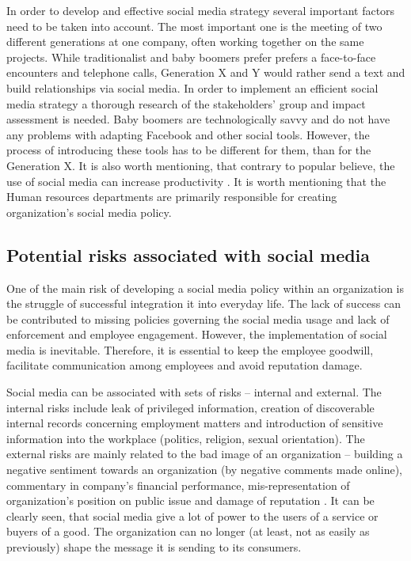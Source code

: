 \documentclass[a4paper,fleqn,11pt,dvips,titlepage]{article}
\numberwithin{figure}{section}
\numberwithin{equation}{section}
\begin{document}
In order to develop and effective social media strategy several important factors need to be taken into account.
The most important one is the meeting of two different generations at one company, often working together on the same projects.
While traditionalist and baby boomers prefer prefers a face-to-face encounters and telephone calls,
Generation X and Y would rather send a text and build relationships via social media.
In order to implement an efficient social media strategy a thorough research of the stakeholders’ group and impact assessment is needed.
Baby boomers are technologically savvy and do not have any problems with adapting Facebook and other social tools.
However, the process of introducing these tools has to be different for them, than for the Generation X.
It is also worth mentioning, that contrary to popular believe, the use of social media can increase productivity \cite{kpmg}.
It is worth mentioning that the Human resources departments are primarily responsible for creating organization’s social media policy. 

\subsection{Potential risks associated with social media}

One of the main risk of developing a social media policy within an organization is the struggle of successful integration it into everyday life.
The lack of success can be contributed to missing policies governing the social media usage and lack of enforcement and employee engagement.
However, the implementation of social media is inevitable.
Therefore, it is essential to keep the employee goodwill, facilitate communication among employees and avoid reputation damage. 

Social media can be associated with sets of risks – internal and external.
The internal risks include leak of privileged information,
creation of discoverable internal records concerning employment matters and introduction of sensitive information into the workplace
(politics, religion, sexual orientation).
The external risks are mainly related to the bad image of an organization
– building a negative sentiment towards an organization (by negative comments made online),
commentary in company’s financial performance, mis-representation of organization’s position on public issue and damage of reputation \cite{kpmg}.
It can be clearly seen, that social media give a lot of power to the users of a service or buyers of a good.
The organization can no longer (at least, not as easily as previously) shape the message it is sending to its consumers. 
\end{document}

